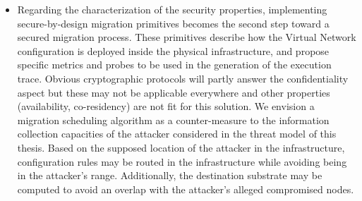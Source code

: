 \begin{itemize}
    \item 
    Regarding the characterization of the security properties, implementing secure-by-design migration primitives becomes the second step toward a secured migration process. These primitives describe how the Virtual Network configuration is deployed inside the physical infrastructure, and propose specific metrics and probes to be used in the generation of the execution trace. Obvious cryptographic protocols will partly answer the confidentiality aspect but these may not be applicable everywhere and other properties (\eg availability, co-residency) are not fit for this solution. We envision a migration scheduling algorithm as a counter-measure to the information collection capacities of the attacker considered in the threat model of this thesis. Based on the supposed location of the attacker in the infrastructure, configuration rules may be routed in the infrastructure while avoiding being in the attacker's range. Additionally, the destination substrate may be computed to avoid an overlap with the attacker's alleged compromised nodes.
    
\end{itemize}

